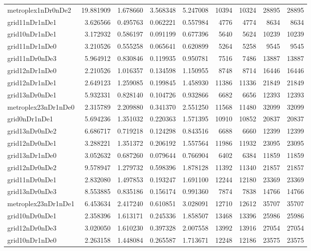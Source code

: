 \begin{longtable}{|l|r|r|r|r|r|r|r|r|}
metroplex1nDr0nDe2 & 19.881909 & 1.678660 & 3.568348 & 5.247008 & 10394 & 10324 & 28895 & 28895 \\
grid11nDr1nDe1 & 3.626566 & 0.495763 & 0.062221 & 0.557984 & 4776 & 4774 & 8634 & 8634 \\
grid10nDr1nDe1 & 3.172932 & 0.586197 & 0.091199 & 0.677396 & 5640 & 5624 & 10239 & 10239 \\
grid11nDr1nDe0 & 3.210526 & 0.555258 & 0.065641 & 0.620899 & 5264 & 5258 & 9545 & 9545 \\
grid11nDr0nDe3 & 5.964912 & 0.830846 & 0.119935 & 0.950781 & 7516 & 7486 & 13887 & 13887 \\
grid12nDr1nDe0 & 2.210526 & 1.016357 & 0.134598 & 1.150955 & 8748 & 8714 & 16446 & 16446 \\
grid12nDr1nDe1 & 2.649123 & 1.259085 & 0.199845 & 1.458930 & 11386 & 11336 & 21849 & 21849 \\
grid13nDr0nDe1 & 5.932331 & 0.828140 & 0.104726 & 0.932866 & 6682 & 6656 & 12393 & 12393 \\
metroplex23nDr1nDe0 & 2.315789 & 2.209880 & 0.341370 & 2.551250 & 11568 & 11480 & 32099 & 32099 \\
grid0nDr1nDe1 & 5.694236 & 1.351032 & 0.220363 & 1.571395 & 10910 & 10852 & 20837 & 20837 \\
grid13nDr0nDe2 & 6.686717 & 0.719218 & 0.124298 & 0.843516 & 6688 & 6660 & 12399 & 12399 \\
grid12nDr0nDe1 & 3.288221 & 1.351372 & 0.206192 & 1.557564 & 11986 & 11932 & 23095 & 23095 \\
grid13nDr1nDe0 & 3.052632 & 0.687260 & 0.079644 & 0.766904 & 6402 & 6384 & 11859 & 11859 \\
grid12nDr0nDe2 & 9.578947 & 1.279732 & 0.598396 & 1.878128 & 11392 & 11340 & 21857 & 21857 \\
grid11nDr0nDe1 & 2.832080 & 1.497853 & 0.193247 & 1.691100 & 12244 & 12180 & 23369 & 23369 \\
grid13nDr0nDe3 & 8.553885 & 0.835186 & 0.156174 & 0.991360 & 7874 & 7838 & 14766 & 14766 \\
metroplex23nDr1nDe1 & 6.453634 & 2.417240 & 0.610851 & 3.028091 & 12710 & 12612 & 35707 & 35707 \\
grid10nDr0nDe1 & 2.358396 & 1.613171 & 0.245336 & 1.858507 & 13468 & 13396 & 25986 & 25986 \\
grid12nDr0nDe3 & 3.020050 & 1.610230 & 0.397328 & 2.007558 & 13992 & 13916 & 27054 & 27054 \\
grid10nDr1nDe0 & 2.263158 & 1.448084 & 0.265587 & 1.713671 & 12248 & 12186 & 23575 & 23575 \\

\end{longtable}
